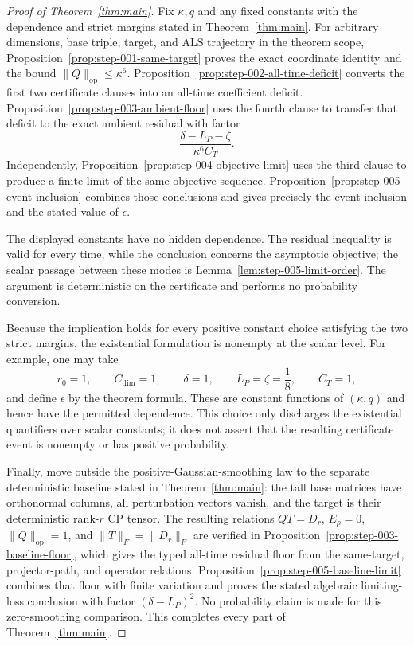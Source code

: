 \begin{proof}[Proof of Theorem~\ref{thm:main}]
Fix $\kappa,q$ and any fixed constants with the dependence and
strict margins stated in Theorem~\ref{thm:main}.  For arbitrary dimensions,
base triple, target, and ALS trajectory in the theorem scope,
Proposition~\ref{prop:step-001-same-target} proves the exact coordinate
identity and the bound $\|Q\|_{\mathrm{op}}\leq\kappa^6$.
Proposition~\ref{prop:step-002-all-time-deficit} converts the first two
certificate clauses into an all-time coefficient deficit.
Proposition~\ref{prop:step-003-ambient-floor} uses the fourth clause to
transfer that deficit to the exact ambient residual with factor
\[
\frac{\delta-L_P-\zeta}{\kappa^6C_T}.
\]
Independently, Proposition~\ref{prop:step-004-objective-limit} uses the third
clause to produce a finite limit of the same objective sequence.
Proposition~\ref{prop:step-005-event-inclusion} combines those conclusions
and gives precisely the event inclusion and the stated value of $\epsilon$.

The displayed constants have no hidden dependence.  The residual inequality
is valid for every time, while the conclusion concerns the asymptotic
objective; the scalar passage between these modes is
Lemma~\ref{lem:step-005-limit-order}.  The argument is deterministic on the
certificate and performs no probability conversion.

Because the implication holds for every positive constant choice satisfying
the two strict margins, the existential formulation is nonempty at the scalar
level.  For example, one may take
\[
r_0=1,
\qquad C_{\mathrm{dim}}=1,
\qquad \delta=1,
\qquad L_P=\zeta=\frac18,
\qquad C_T=1,
\]
and define $\epsilon$ by the theorem formula.  These are constant functions
of $(\kappa,q)$ and hence have the permitted dependence.  This choice only
discharges the existential quantifiers over scalar constants; it does not
assert that the resulting certificate event is nonempty or has positive
probability.

Finally, move outside the positive-Gaussian-smoothing law to the separate
deterministic baseline stated in Theorem~\ref{thm:main}: the tall base
matrices have orthonormal columns, all perturbation vectors vanish, and the
target is their deterministic rank-$r$ CP tensor.  The resulting relations
$QT=D_r$, $E_\rho=0$, $\|Q\|_{\mathrm{op}}=1$, and
$\|T\|_F=\|D_r\|_F$ are verified in
Proposition~\ref{prop:step-003-baseline-floor}, which gives the typed
all-time residual floor from the same-target, projector-path, and operator
relations.  Proposition~\ref{prop:step-005-baseline-limit} combines that
floor with finite variation and proves the stated algebraic limiting-loss
conclusion with factor $(\delta-L_P)^2$.  No probability claim is made for
this zero-smoothing comparison.  This completes every part of
Theorem~\ref{thm:main}.
\end{proof}
